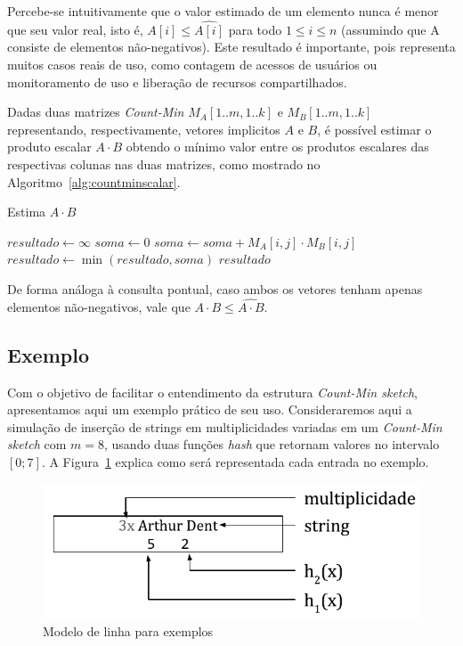 Percebe-se intuitivamente que o valor estimado de um elemento nunca é menor que seu valor real, isto é, $A[i] \leq \hat{A[i]}$ para todo $1 \leq i \leq n$ (assumindo que A consiste de elementos não-negativos). Este resultado é importante, pois representa muitos casos reais de uso, como contagem de acessos de usuários ou monitoramento de uso e liberação de recursos compartilhados.

Dadas duas matrizes \emph{Count-Min} $M_A[1..m, 1..k]$ e $M_B[1..m, 1..k]$ representando, respectivamente, vetores implicitos $A$ e $B$, é possível estimar o produto escalar $A \cdot B$ obtendo o mínimo valor entre os produtos escalares das respectivas colunas nas duas matrizes, como mostrado no Algoritmo~\ref{alg:countminscalar}.

\begin{algorithm}
\linespread{1}\selectfont
\caption{Estima $A \cdot B$}
\label{alg:countminscalar}
\begin{algorithmic}[1]
    \State $resultado \gets \infty$ 
        \State $soma \gets 0$ 
            \State $soma \gets soma + M_A[i, j] \cdot M_B[i, j]$
        \EndFor
        \State $resultado \gets \min(resultado, soma)$
	\EndFor
	\Return $resultado$
\EndFunction
\end{algorithmic}
\end{algorithm}

De forma análoga à consulta pontual, caso ambos os vetores tenham apenas elementos não-negativos, vale que $A \cdot B \leq \widehat{A \cdot B}$.

\subsection{Exemplo}\label{sec:countmin:example}

Com o objetivo de facilitar o entendimento da estrutura \emph{Count-Min sketch}, apresentamos aqui um exemplo prático de seu uso. Consideraremos aqui a simulação de inserção de strings em multiplicidades variadas em um \emph{Count-Min sketch} com $m = 8$, usando duas funções \emph{hash} que retornam valores no intervalo $[0;7]$. A Figura~\ref{fig:countmin_example_legend} explica como será representada cada entrada no exemplo.

\begin{figure}[!htbp]
  \centering
  \includegraphics[scale=0.6]{figures/countmin_example_legend.pdf}
  \caption{Modelo de linha para exemplos}
  \label{fig:countmin_example_legend}
\end{figure}

